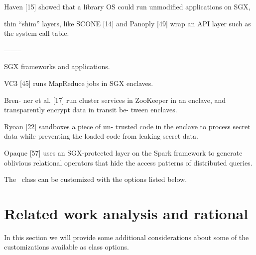 Haven [15] showed
that a library OS could run unmodified applications on
SGX,

thin “shim” layers, like SCONE [14] and Panoply [49] wrap 
an API layer such as the system call table.


--------


SGX frameworks and applications.

VC3 [45]
runs MapReduce jobs in SGX enclaves.

Bren-
ner et al. [17] run cluster services in ZooKeeper in an
enclave, and transparently encrypt data in transit be-
tween enclaves.

Ryoan [22] sandboxes a piece of un-
trusted code in the enclave to process secret data while
preventing the loaded code from leaking secret data.

Opaque [57] uses an SGX-protected layer on the Spark
framework to generate oblivious relational operators that
hide the access patterns of distributed queries.

The \novathesis\ class can be customized with the options listed below.



\section{Related work analysis and rational} %
\label{sec:relatedwork_analysis}

In this section we will provide some additional considerations about some of the customizations available as class options.



